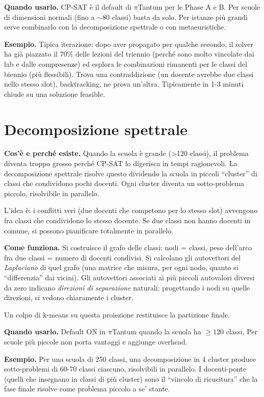 \textbf{Quando usarlo.} CP-SAT \`e il default di $\pi$Tantum
per le Phase A e B. Per scuole di dimensioni normali (fino a
$\sim$80 classi) basta da solo. Per istanze pi\`u grandi
serve combinarlo con la decomposizione spettrale o con
metaeuristiche.

\textbf{Esempio.} Tipica iterazione: dopo aver propagato per
qualche secondo, il solver ha gi\`a piazzato il 70\% delle
lezioni del triennio (perch\'e sono molto vincolate dai lab e
dalle compresenze) ed esplora le combinazioni rimanenti per
le classi del biennio (pi\`u flessibili). Trova una
contraddizione (un docente avrebbe due classi nello stesso
slot), backtracking, ne prova un'altra. Tipicamente in 1-3
minuti chiude su una soluzione feasible.

\section{Decomposizione spettrale}

\textbf{Cos'\`e e perch\'e esiste.} Quando la scuola \`e grande
(>120 classi), il problema diventa troppo grosso perch\'e
CP-SAT lo digerisca in tempi ragionevoli. La decomposizione
spettrale risolve questo dividendo la scuola in piccoli
``cluster'' di classi che condividono pochi docenti. Ogni
cluster diventa un sotto-problema piccolo, risolvibile in
parallelo.

L'idea \`e: i conflitti veri (due docenti che competono per
lo stesso slot) avvengono fra classi che condividono lo
stesso docente. Se due classi non hanno docenti in comune,
si possono pianificare totalmente in parallelo.

\textbf{Come funziona.} Si costruisce il grafo delle classi:
nodi = classi, peso dell'arco fra due classi = numero di
docenti condivisi. Si calcolano gli autovettori del
\emph{Laplaciano} di quel grafo (una matrice che misura,
per ogni nodo, quanto si ``differenzia'' dai vicini). Gli
autovettori associati ai pi\`u piccoli autovalori
diversi da zero indicano \emph{direzioni di separazione}
naturali: progettando i nodi su quelle direzioni, si vedono
chiaramente i cluster.

Un colpo di k-means su questa proiezione restituisce la
partizione finale.

\textbf{Quando usarlo.} Default ON in $\pi$Tantum quando la
scuola ha $\geq 120$ classi. Per scuole pi\`u piccole non
porta vantaggi e aggiunge overhead.

\textbf{Esempio.} Per una scuola di 250 classi, una
decomposizione in 4 cluster produce sotto-problemi di 60-70
classi ciascuno, risolvibili in parallelo. I docenti-ponte
(quelli che insegnano in classi di pi\`u cluster) sono il
``vincolo di ricucitura'' che la fase finale risolve come
problema piccolo a se' stante.

